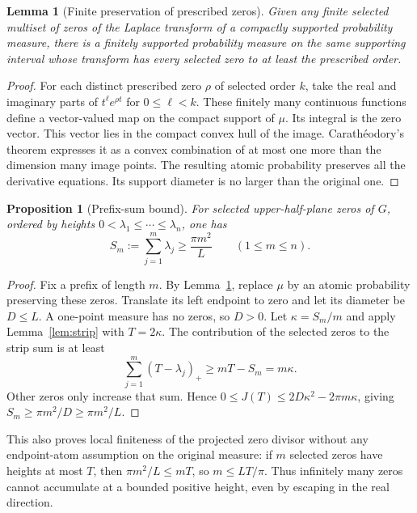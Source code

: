 \documentclass[11pt]{article}
\newtheorem{lemma}[theorem]{Lemma}
\newtheorem{proposition}[theorem]{Proposition}
\theoremstyle{remark}\newtheorem{remark}[theorem]{Remark}
\newcommand{\pos}[1]{(#1)_+}
\begin{document}
\begin{lemma}[Finite preservation of prescribed zeros]\label{lem:finite}
Given any finite selected multiset of zeros of the Laplace transform of a compactly
supported probability measure, there is a finitely supported probability measure
on the same supporting interval whose transform has every selected zero to at
least the prescribed order.
\end{lemma}

\begin{proof}
For each distinct prescribed zero $\rho$ of selected order $k$, take the real
and imaginary parts of $t^\ell e^{\rho t}$ for $0\le\ell<k$. These finitely
many continuous functions define a vector-valued map on the compact support of
$\mu$. Its integral is the zero vector. This vector lies in the compact convex
hull of the image. Carath\'eodory's theorem expresses it as a convex combination
of at most one more than the dimension many image points. The resulting atomic
probability preserves all the derivative equations. Its support diameter is
no larger than the original one.
\end{proof}

\begin{proposition}[Prefix-sum bound]\label{prop:prefix}
For selected upper-half-plane zeros of $G$, ordered by heights
$0<\lambda_1\le\cdots\le\lambda_n$, one has
\begin{equation}\label{eq:prefix}
 S_m:=\sum_{j=1}^m\lambda_j\ge\frac{\pi m^2}{L}
 \qquad(1\le m\le n).
\end{equation}
\end{proposition}

\begin{proof}
Fix a prefix of length $m$. By Lemma~\ref{lem:finite}, replace $\mu$ by an
atomic probability preserving these zeros. Translate its left endpoint to zero
and let its diameter be $D\le L$. A one-point measure has no zeros, so $D>0$.
Let $\kappa=S_m/m$ and apply Lemma~\ref{lem:strip} with $T=2\kappa$.
The contribution of the selected zeros to the strip sum is at least
\[
 \sum_{j=1}^m\pos{T-\lambda_j}
 \ge mT-S_m=m\kappa.
\]
Other zeros only increase that sum. Hence
$0\le J(T)\le2D\kappa^2-2\pi m\kappa$, giving
$S_m\ge\pi m^2/D\ge\pi m^2/L$.
\end{proof}

This also proves local finiteness of the projected zero divisor without any
endpoint-atom assumption on the original measure: if $m$ selected zeros have
heights at most $T$, then $\pi m^2/L\le mT$, so $m\le LT/\pi$.
Thus infinitely many zeros cannot accumulate at a bounded positive height,
even by escaping in the real direction.
\end{document}
